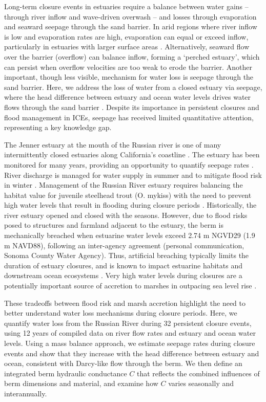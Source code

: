 \documentclass[preprint,12pt,authoryear]{elsarticle}
\begin{document}
Long-term closure events in estuaries require a balance between water gains --through river inflow and wave-driven overwash -- and losses through evaporation and seaward seepage through the sand barrier.
In arid regions where river inflow is low and evaporation rates are high, evaporation can equal or exceed inflow, particularly in estuaries with larger surface areas \citep{largier2023recognizing}.
Alternatively, seaward flow over the barrier (overflow) can balance inflow, forming a `perched estuary', which can persist when overflow velocities are too weak to erode the barrier.
Another important, though less visible, mechanism for water loss is seepage through the sand barrier.
Here, we address the loss of water from a closed estuary via seepage, where  the head difference between estuary and ocean water levels drives water flows through the sand barrier \citep{perissinotto2010ecosystem}.
 Despite its importance in persistent closures and flood management in ICEs, seepage has received limited quantitative attention, representing a key knowledge gap.

The Jenner estuary at the mouth of the Russian river is one of many intermittently closed estuaries along California's coastline \citep{johnson1973characteristics, goodwin1996predicting, heady2015assessing}. The estuary has been monitored for many years, providing an opportunity to quantify seepage rates \citep{largier20205}.
River discharge is managed for water supply in summer and to mitigate flood risk in winter \citep{SonomaWater2011EIR}.
Management of the Russian River estuary requires balancing the habitat value for juvenile steelhead trout (O. mykiss) with the need to prevent high water levels that result in flooding during closure periods \citep{largier20205}. Historically, the river estuary opened and closed with the seasons.  However, due to flood risks posed to structures and farmland adjacent to the estuary, the berm is mechanically breached when estuarine water levels exceed 2.74 m NGVD29 (1.9 m NAVD88), following an inter-agency agreement (personal communication, Sonoma County Water Agency). Thus, artificial breaching typically limits the duration of estuary closures, and is known to impact estuarine habitats and downstream ocean ecosystems  \citep{largier2023recognizing, slinger2017modes}.  Very high water levels during closures are a potentially important source of accretion to marshes in outpacing sea level rise \citep{thorne2021wetlands}.

These tradeoffs between flood risk and marsh accretion highlight the need to better understand water loss mechanisms during closure periods. Here, we quantify water loss from the Russian River during 32 persistent closure events, using 12 years of compiled data on river flow rates and estuary and ocean water levels.
Using a mass balance approach, we estimate seepage rates during closure events and show that they increase with the head difference between estuary and ocean, consistent with Darcy-like flow through the berm.
We then define an integrated berm hydraulic conductance $C$ that reflects the combined influences of berm dimensions and material, and examine how $C$ varies seasonally and interannually.
\end{document}
